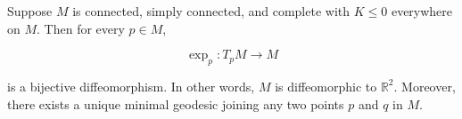 Suppose $M$ is connected, simply connected, and complete with $K \leq 0$ everywhere on $M$. Then for every $p \in M$,

$$\exp_p: T_p M \to M$$

is a bijective diffeomorphism. In other words, $M$ is diffeomorphic to $\mathbb{R}^2$. Moreover, there exists a unique minimal geodesic joining any two points $p$ and $q$ in $M$.
